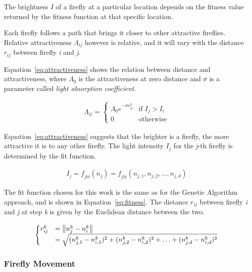 The brightness $I$ of a firefly at a particular location depends
on the fitness value returned by the fitness function at that specific location.

Each firefly follows a path that brings it closer to other
attractive fireflies. Relative attractiveness $\Lambda_{ij}$ however is relative,
and it will vary with the distance $r_{ij}$ between firefly \textit{i} and \textit{j}.

Equation~\ref{eq:attractiveness} shows the relation between distance and attractiveness,
where $\Lambda_0$ is the attractiveness at zero distance and $\sigma$ is
a parameter called \textit{light absorption coefficient}.

\begin{align}
\label{eq:attractiveness}
\Lambda_{ij}=
\begin{cases}
\Lambda_0 e^{-\sigma r_{ij}^2} & \text{if } I_j > I_i \\
0 & \text{otherwise}
\end{cases}
\end{align}

Equation~\ref{eq:attractiveness} suggests that the brighter is a firefly,
the more attractive it is to any other firefly. The light intensity $I_j$
for the \textit{j}-th firefly is determined by the fit function.

\begin{align}
I_j = \mathit{f}_{fit}(n_j) = \mathit{f}_{fit}(n_{j,1},n_{j,2},\ldots,n_{j,d})
\end{align}


The fit function chosen for this work is the same as for the Genetic Algorithm
approach, and is shown in Equation~\ref{eq:fitness}. 
The distance $r_{ij}$ between firefly \textit{i} and \textit{j}
at step \textit{k} is given by the Euclidean distance between the two.

\begin{equation}
\begin{cases}
r_{ij}^k &= \norm{n_j^k-n_i^k} \\ 
&= \sqrt{(n_{j,1}^k-n_{i,1}^k)^2+(n_{j,2}^k-n_{i,2}^k)^2+\ldots+(n_{j,d}^k-n_{i,d}^k)^2}
\end{cases}
\end{equation}

\subsubsection{Firefly Movement}
\label{sec:5.famovement}

